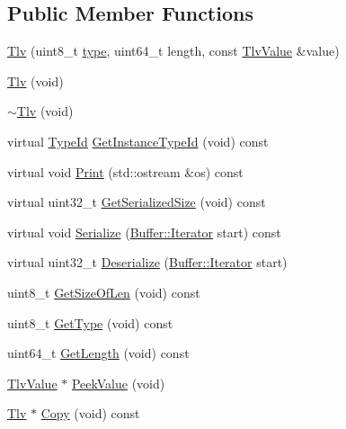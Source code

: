 \subsection*{Public Member Functions}
\begin{DoxyCompactItemize}
\item 
\hyperlink{classns3_1_1Tlv_adebbfe8e86a7e42b8e76ecbb9f815c38}{Tlv} (uint8\+\_\+t \hyperlink{visualizer-ideas_8txt_add98db9e15e2a58cf2b57623e7aa893a}{type}, uint64\+\_\+t length, const \hyperlink{classns3_1_1TlvValue}{Tlv\+Value} \&value)
\item 
\hyperlink{classns3_1_1Tlv_afcb108dfdebaf93fe0ab840f6cc34672}{Tlv} (void)
\item 
\hyperlink{classns3_1_1Tlv_ada819d68fe7e61df0534d1714b1a1230}{$\sim$\+Tlv} (void)
\item 
virtual \hyperlink{classns3_1_1TypeId}{Type\+Id} \hyperlink{classns3_1_1Tlv_a28f789bd633d7228a8460c0afa097aa7}{Get\+Instance\+Type\+Id} (void) const 
\item 
virtual void \hyperlink{classns3_1_1Tlv_a782158dc78a558423ae10061c4c919bf}{Print} (std\+::ostream \&os) const 
\item 
virtual uint32\+\_\+t \hyperlink{classns3_1_1Tlv_a8596b6e1f5a87c737d87bef4d9fbb83c}{Get\+Serialized\+Size} (void) const 
\item 
virtual void \hyperlink{classns3_1_1Tlv_a9e4ace7d442888d08d414381432272f5}{Serialize} (\hyperlink{classns3_1_1Buffer_1_1Iterator}{Buffer\+::\+Iterator} start) const 
\item 
virtual uint32\+\_\+t \hyperlink{classns3_1_1Tlv_ab7f78a79bda165414feb774daf217fc2}{Deserialize} (\hyperlink{classns3_1_1Buffer_1_1Iterator}{Buffer\+::\+Iterator} start)
\item 
uint8\+\_\+t \hyperlink{classns3_1_1Tlv_a1dfbebef6a6e426351d38fe019254413}{Get\+Size\+Of\+Len} (void) const 
\item 
uint8\+\_\+t \hyperlink{classns3_1_1Tlv_af04a5829d658dfb455b12bf2c5dbd303}{Get\+Type} (void) const 
\item 
uint64\+\_\+t \hyperlink{classns3_1_1Tlv_ab41a08b1425dd07f37e3d50c7e9b3c2b}{Get\+Length} (void) const 
\item 
\hyperlink{classns3_1_1TlvValue}{Tlv\+Value} $\ast$ \hyperlink{classns3_1_1Tlv_a8e14be15a99d51a19361a4e6574e2403}{Peek\+Value} (void)
\item 
\hyperlink{classns3_1_1Tlv}{Tlv} $\ast$ \hyperlink{classns3_1_1Tlv_a3b0052e2d8b687949530b51a17e0d992}{Copy} (void) const 
\item 

\end{DoxyCompactItemize}
